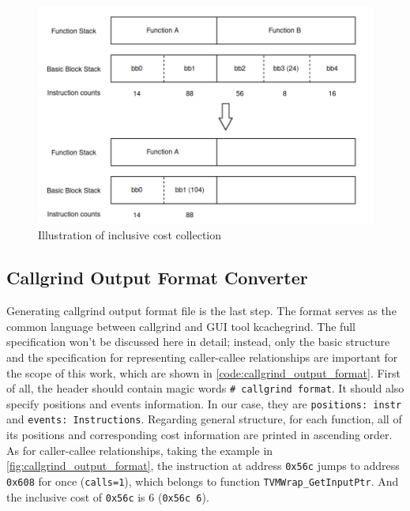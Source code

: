 \begin{figure}
    \centering
    \includegraphics[width=\linewidth]{figures/Analyzer_inclusive_cost.png}
    \caption{Illustration of inclusive cost collection}
    \label{fig:analyzer_inclusive_cost}
\end{figure}
                    
\subsection{Callgrind Output Format Converter}
\label{sec:converter}

Generating callgrind output format file is the last step. The format serves as the common language between callgrind and GUI tool kcachegrind. The full specification won't be discussed here in detail; instead, only the basic structure and the specification for representing caller-callee relationships are important for the scope of this work, which are shown in \cref{code:callgrind_output_format}. First of all, the header should contain magic words \texttt{\# callgrind format}. It should also specify positions and events information. In our case, they are \texttt{positions: instr} and \texttt{events: Instructions}. Regarding general structure, for each function, all of its positions and corresponding cost information are printed in ascending order. As for caller-callee relationships, taking the example in \cref{fig:callgrind_output_format}, the instruction at address \texttt{0x56c} jumps to address \texttt{0x608} for once (\texttt{calls=1}), which belongs to function \texttt{TVMWrap\_GetInputPtr}. And the inclusive cost of \texttt{0x56c} is 6 (\texttt{0x56c 6}).

\lstset{
  basicstyle=\footnotesize\ttfamily,
  breaklines=true,
  frame=single,
  showstringspaces=false,
  captionpos=b
}


